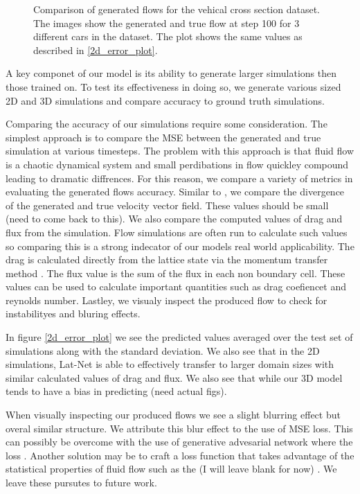 \documentclass{article}
\begin{document}
\begin{figure}[!t]
\caption{Comparison of generated flows for the vehical cross section dataset. The images show the generated and true flow at step 100 for 3 different cars in the dataset. The plot shows the same values as described in \ref{2d_error_plot}.}
\label{car_dataset}
\end{figure}


A key componet of our model is its ability to generate larger simulations then those trained on. To test its effectiveness in doing so, we generate various sized 2D and 3D simulations and compare accuracy to ground truth simulations.

Comparing the accuracy of our simulations require some consideration. The simplest approach is to compare the MSE between the generated and true simulation at various timesteps. The problem with this approach is that fluid flow is a chaotic dynamical system and small perdibations in flow quickley compound leading to dramatic diffrences. For this reason, we compare a variety of metrics in evaluating the generated flows accuracy. Similar to \cite{tompson2016accelerating}, we compare the divergence of the generated and true velocity vector field. These values should be small (need to come back to this). We also compare the computed values of drag and flux from the simulation. Flow simulations are often run to calculate such values so comparing this is a strong indecator of our models real world applicability. The drag is calculated directly from the lattice state via the momentum transfer method \cite{guo2013lattice}. The flux value is the sum of the flux in each non boundary cell. These values can be used to calculate important quantities such as drag coefiencet and reynolds number. Lastley, we visualy inspect the produced flow to check for instabilityes and bluring effects.

In figure \ref{2d_error_plot} we see the predicted values averaged over the test set of simulations along with the standard deviation. We also see that in the 2D simulations, Lat-Net is able to effectively transfer to larger domain sizes with similar calculated values of drag and flux. We also see that while our 3D model tends to have a bias in predicting (need actual figs).

When visually inspecting our produced flows we see a slight blurring effect but overal similar structure. We attribute this blur effect to the use of MSE loss. This can possibly be overcome with the use of generative advesarial network \cite{goodfellow2014generative} where the loss . Another solution may be to craft a loss function that takes advantage of the statistical properties of fluid flow such as the (I will leave blank for now) \cite{kim2008wavelet}. We leave these pursutes to future work.
\end{document}
